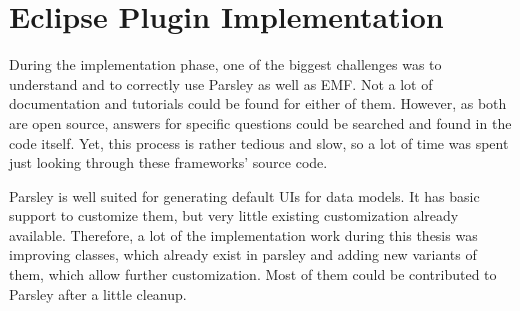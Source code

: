 \section{Eclipse Plugin Implementation}
\label{sec:ch4:s4}

During the implementation phase, one of the biggest challenges was to understand and to correctly use \gls{Parsley} as well as \gls{EMF}.
Not a lot of documentation and tutorials could be found for either of them.
However, as both are open source, answers for specific questions could be searched and found in the code itself.
Yet, this process is rather tedious and slow, so a lot of time was spent just looking through these frameworks' source code.

\Gls{Parsley} is well suited for generating default \glspl{UI} for data models.
It has basic support to customize them, 
but very little existing customization already available.
Therefore, a lot of the implementation work during this thesis was improving classes, which already exist in parsley 
and adding new variants of them, which allow further customization.
Most of them could be contributed to \gls{Parsley} after a little cleanup.

